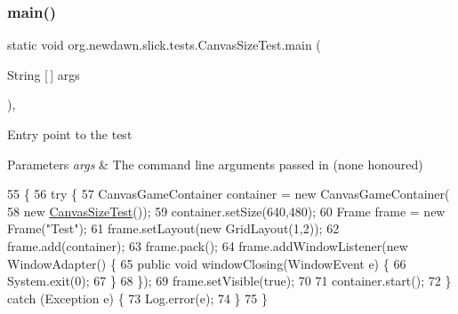 \subsubsection{\texorpdfstring{main()}{main()}}
{\footnotesize\ttfamily static void org.\+newdawn.\+slick.\+tests.\+Canvas\+Size\+Test.\+main (\begin{DoxyParamCaption}\item[{String \mbox{[}$\,$\mbox{]}}]{args }\end{DoxyParamCaption})\hspace{0.3cm}{\ttfamily [inline]}, {\ttfamily [static]}}

Entry point to the test


\begin{DoxyParams}{Parameters}
{\em args} & The command line arguments passed in (none honoured) \\
\hline
\end{DoxyParams}

\begin{DoxyCode}
55                                            \{
56         \textcolor{keywordflow}{try} \{
57             CanvasGameContainer container = \textcolor{keyword}{new} CanvasGameContainer(
58                     \textcolor{keyword}{new} \mbox{\hyperlink{classorg_1_1newdawn_1_1slick_1_1tests_1_1_canvas_size_test_a2c4dfef634aa9600288b5c47120c83f7}{CanvasSizeTest}}());
59             container.setSize(640,480);
60             Frame frame = \textcolor{keyword}{new} Frame(\textcolor{stringliteral}{"Test"});
61             frame.setLayout(\textcolor{keyword}{new} GridLayout(1,2));
62             frame.add(container);
63             frame.pack();
64             frame.addWindowListener(\textcolor{keyword}{new} WindowAdapter() \{
65                 \textcolor{keyword}{public} \textcolor{keywordtype}{void} windowClosing(WindowEvent e) \{
66                     System.exit(0);
67                 \}
68             \});
69             frame.setVisible(\textcolor{keyword}{true});
70     
71             container.start();
72         \} \textcolor{keywordflow}{catch} (Exception e) \{
73             Log.error(e);
74         \}
75     \}
\end{DoxyCode}
\mbox{\label{classorg_1_1newdawn_1_1slick_1_1tests_1_1_canvas_size_test_a11b37e926c399dee2d9297bc036dfbfa}} 
